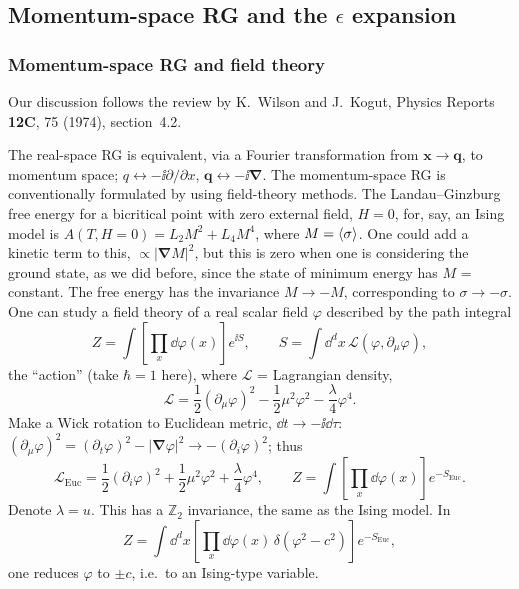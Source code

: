 \subsection{Momentum-space RG and the \texorpdfstring{$\epsilon$}{epsilon} expansion}
\subsubsection*{Momentum-space RG and field theory}

Our discussion follows the review by K.~Wilson and J.~Kogut, Physics Reports \textbf{12C}, 75 (1974),
section~4.2.

The real-space RG is equivalent, via a Fourier transformation from $\mathbf x\to\mathbf q$, to momentum
space; $q\leftrightarrow-\ii\partial/\partial x$, $\mathbf q\leftrightarrow-\ii\boldsymbol\nabla$. The
momentum-space RG is conventionally formulated by using field-theory methods. The Landau--Ginzburg free
energy for a bicritical point with zero external field, $H = 0$, for, say, an Ising model is
$A(T,H=0) = L_2M^2 + L_4M^4$, where $M = \langle \sigma\rangle$. One could add a kinetic term to this,
$\propto|\boldsymbol\nabla M|^2$, but this is zero when one is considering the ground state, as we did before,
since the state of minimum energy has $M$ = constant. The free energy has the invariance $M\to-M$,
corresponding to $\sigma\to-\sigma$. One can study a field theory of a real scalar field $\varphi$ described by
the path integral
\begin{equation}
  Z = \int\left[\prod_x\dd\varphi(x)\right]e^{\ii S},\qquad S = \int\dd^dx\,\mathcal L(\varphi,\partial_\mu\varphi),
\end{equation}
the ``action'' (take $\hbar = 1$ here), where $\mathcal L$ = Lagrangian density,
\begin{equation}
  \mathcal L = \frac{1}{2}(\partial_\mu\varphi)^2 - \frac{1}{2}\mu^2\varphi^2 - \frac{\lambda}{4}\varphi^4 .
\end{equation}
Make a Wick rotation to Euclidean metric, $\dd t\to-\ii\dd\tau$:
$(\partial_\mu\varphi)^2 = (\partial_t\varphi)^2-|\boldsymbol\nabla\varphi|^2\to-(\partial_i\varphi)^2$; thus
\begin{equation}
  \mathcal L_{\text{Euc}} = \frac{1}{2}(\partial_i\varphi)^2 + \frac{1}{2}\mu^2\varphi^2 + \frac{\lambda}{4}\varphi^4,
  \qquad Z = \int\left[\prod_x\dd\varphi(x)\right]e^{-S_{\text{Euc}}} .
\end{equation}
Denote $\lambda = u$. This has a $\mathbb{Z}_2$ invariance, the same as the Ising model. In
\begin{equation}
  Z = \int\dd^dx\left[\prod_x\dd\varphi(x)\,\delta(\varphi^2-c^2)\right]e^{-S_{\text{Euc}}},
\end{equation}
one reduces $\varphi$ to $\pm c$, i.e.\ to an Ising-type variable.

